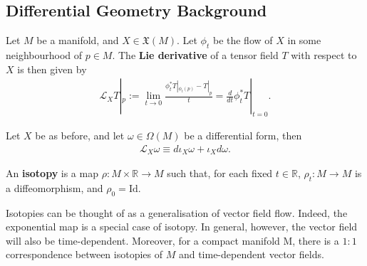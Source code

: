 \documentclass[11pt, final]{article}
\begin{document}
\subsection{Differential Geometry Background}

\begin{definition}
	Let $M$ be a manifold, and $X \in \mathfrak{X}(M)$. Let $\phi_t$ be the flow of $X$ in some neighbourhood of $p \in M$. The \textbf{Lie derivative} of a tensor field $T$ with respect to $X$ is then given by
		\begin{align}
			\mathcal{L}_X T|_p := \lim_{t \to 0} \frac{\phi^*_t T|_{\phi_t(p)} - T|_p}{t} = \frac{d}{dt} \phi^*_t T |_{t=0}.
		\end{align}
\end{definition}

\begin{prop}
	Let $X$ be as before, and let $\omega \in \Omega(M)$ be a differential form, then
	\begin{align}\label{eq:CartanMagic}
		\mathcal{L}_X \omega \equiv d \iota_X \omega + \iota_X d \omega.
	\end{align}
\end{prop}

\begin{definition}[Isotopy]
	An \textbf{isotopy} is a map $\rho: M \times \mathbb{R} \to M$ such that, for each fixed $t \in \mathbb{R}$, $\rho_t : M \to M$ is a diffeomorphism, and $\rho_0 = \mathrm{Id}$.
\end{definition}

\begin{remark}
	Isotopies can be thought of as a generalisation of vector field flow. Indeed, the exponential map is a special case of isotopy. In general, however, the vector field will also be time-dependent. Moreover, for a compact manifold M, there is a $1:1$ correspondence between isotopies of $M$ and time-dependent vector fields.
\end{remark}
\end{document}
